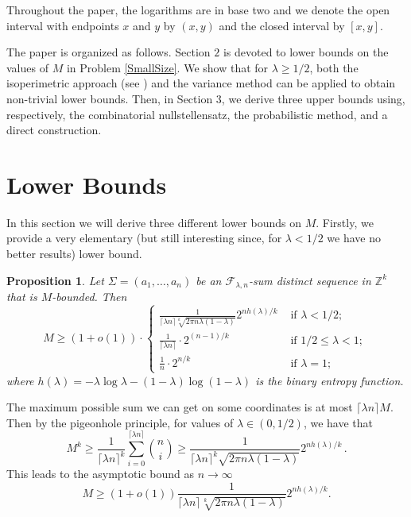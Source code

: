 \documentclass[a4paper]{amsart}
\theoremstyle{plain}
\newtheorem{Proposition}[Definition]{Proposition}
\begin{document}
Throughout the paper,  the logarithms are in base two and we denote the open interval with endpoints $x$ and $y$ by $(x,y)$ and the closed interval by $[x,y]$.

The paper is organized as follows.
Section $2$ is devoted to lower bounds on the values of $M$ in Problem \ref{SmallSize}. We show that for $\lambda\geq 1/2$, both the isoperimetric approach (see \cite{Fox}) and the variance method can be applied to obtain non-trivial lower bounds. Then, in Section $3$, we derive three upper bounds using, respectively, the combinatorial nullstellensatz, the probabilistic method, and a direct construction. \section{Lower Bounds}
In this section we will derive three different lower bounds on $M$. Firstly, we provide a very elementary (but still interesting since, for $\lambda<1/2$ we have no better results) lower bound.

\begin{Proposition}\label{prop:trivialBound}
Let $\Sigma=(a_1,\dots,a_n)$ be an
$\mathcal{F}_{\lambda,n}$-sum distinct sequence in $\mathbb{Z}^k$ that is $M$-bounded. Then
$$
M \geq (1 + o(1)) \cdot \begin{cases} \frac{1}{\lceil \lambda n \rceil \sqrt[k]{2 \pi n \lambda (1-\lambda)}} 2^{n h(\lambda)/k} & \mbox{ if } \lambda < 1/2;\\
\frac{1}{\lceil \lambda n \rceil} \cdot 2^{(n-1)/k} &\mbox{ if } 1/2 \leq \lambda < 1; \\
\frac{1}{n} \cdot 2^{n/k} &\mbox{ if } \lambda = 1;
\end{cases}\,
$$
where $h(\lambda) = -\lambda \log \lambda - (1-\lambda) \log (1-\lambda)$ is the binary entropy function. 
\end{Proposition}
\proof
The maximum possible sum we can get on some coordinates is at most $\lceil \lambda n \rceil M$. Then by the pigeonhole principle, for values of $\lambda \in (0,1/2)$, we have that
\begin{equation*}\label{eq:sumbinomial}
M^k \geq \frac{1}{\lceil \lambda n \rceil^k} \sum_{i=0}^{\lceil \lambda n \rceil} \binom{n}{i} \geq \frac{1}{\lceil \lambda n \rceil^k \sqrt{2 \pi n \lambda (1-\lambda)}} 2^{n h(\lambda)/k}\,.
\end{equation*}
This leads to the asymptotic bound as $n\to\infty$
\begin{equation*}\label{eq:trivallowerbound}
M \geq (1 + o(1)) \frac{1}{\lceil \lambda n \rceil \sqrt[k]{2 \pi n \lambda (1-\lambda)}} 2^{n h(\lambda)/k}.
\end{equation*}
\end{document}
